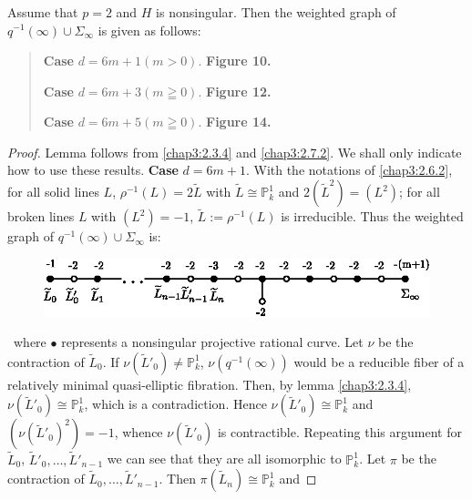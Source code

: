 \subsubsection{}\label{chap3:2.7.4}
\begin{lemma*}
  Assume that $p=2$ and $H$ is nonsingular. Then the weighted graph of
  $q^{-1}(\infty)\cup \Sigma_{\infty}$ is given as follows:
  \begin{quote}
    {\rm\bf Case} $d=6m+1(m>0)$. {\rm\bf Figure 10.}
    
    {\rm\bf Case} $d=6m+3(m\geqq 0)$. {\rm\bf Figure 12.}
    
    {\rm\bf Case} $d=6m+5(m\geqq 0)$. {\rm\bf Figure 14.}
  \end{quote}
\end{lemma*}

\begin{proof}
Lemma follows from \ref{chap3:2.3.4} and \ref{chap3:2.7.2}. We shall only indicate
how to use these results. {\bf Case} $d=6m+1$. With the notations of
\ref{chap3:2.6.2}, for all solid lines $L$, $\rho^{-1}(L)=2\widetilde{L}$
with $\widetilde{L}\cong \mathbb{P}^{1}_{k}$ and
$2(\widetilde{L}^{2})=(L^{2})$; for all broken lines $L$ with
$(L^{2})=-1$, $\widetilde{L}:=\rho^{-1}(L)$ is irreducible. Thus the
weighted graph of $q^{-1}(\infty)\cup \Sigma_{\infty}$ is: 
\begin{figure}[H]
\centering
\includegraphics{figures/miyansi_fig15.eps}
\end{figure}
\noindent\pageoriginale\
where $\bullet$ represents a nonsingular projective rational
curve. Let $\nu$ be the contraction of $\widetilde{L}_{0}$. If
$\nu(\widetilde{L}'_{0})\neq \mathbb{P}^{1}_{k}$,
$\nu(q^{-1}(\infty))$ would be a reducible fiber of a relatively
minimal quasi-elliptic fibration. Then, by lemma \ref{chap3:2.3.4},
$\nu(\widetilde{L}'_{0})\cong\mathbb{P}^{1}_{k}$, which is a
contradiction. Hence $\nu(\widetilde{L}'_{0})\cong\mathbb{P}^{1}_{k}$
and $(\nu(\widetilde{L}'_{0})^{2})=-1$, whence
$\nu(\widetilde{L}'_{0})$ is contractible. Repeating this argument for
$\widetilde{L}_{0}$, $\widetilde{L}'_{0},\ldots,\widetilde{L}'_{n-1}$
we can see that they are all isomorphic to $\mathbb{P}^{1}_{k}$. Let
$\pi$ be the contraction of
$\widetilde{L}_{0},\ldots,\widetilde{L}'_{n-1}$. Then
$\pi(\widetilde{L}_{n})\cong \mathbb{P}^{1}_{k}$ and

\end{proof}
